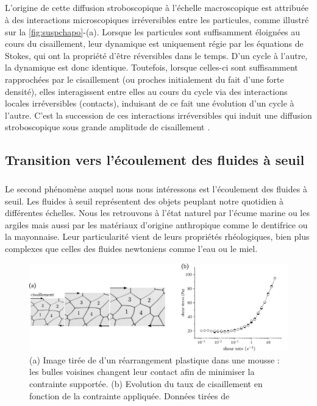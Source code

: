 \subparagraph{}L'origine de cette diffusion stroboscopique à l'échelle macroscopique est attribuée à des interactions microscopiques irréversibles entre les particules, comme illustré sur la \autoref{fig:suspchapo}-(a). Lorsque les particules sont suffisamment éloignées au cours du cisaillement, leur dynamique est uniquement régie par les équations de Stokes, qui ont la propriété d'être réversibles dans le temps. D'un cycle à l'autre, la dynamique est donc identique. Toutefois, lorsque celles-ci sont suffisamment rapprochées par le cisaillement (ou proches initialement du fait d'une forte densité), elles interagissent entre elles au cours du cycle via des interactions locales irréversibles (contacts), induisant de ce fait une évolution d'un cycle à l'autre. C'est la succession de ces interactions irréversibles qui induit une diffusion stroboscopique sous grande amplitude de cisaillement \cite{corte_random_2008}.

\subsection{Transition vers l'écoulement des fluides à seuil}

\subparagraph{}Le second phénomène auquel nous nous intéressons est l'écoulement des fluides à seuil. Les fluides à seuil représentent des objets peuplant notre quotidien à différentes échelles. Nous les retrouvons à l'état naturel par l'écume marine ou les argiles mais aussi par les matériaux d'origine anthropique comme le dentifrice ou la mayonnaise. Leur particularité vient de leurs propriétés rhéologiques, bien plus complexes que celles des fluides newtoniens comme l'eau ou le miel.

\begin{figure}[h]
	\centering
	\includegraphics[width=\textwidth]{Chapitre1/Figures/Chapo/yielding.pdf}
	\caption{(a) Image tirée de \cite{dollet_rheology_2014} d'un réarrangement plastique dans une mousse : les bulles voisines changent leur contact afin de minimiser la contrainte supportée. (b) Evolution du taux de cisaillement en fonction de la contrainte appliquée. Données tirées de \cite{moller_origin_2009}}
	\label{fig:yieldingchapo}
\end{figure}


